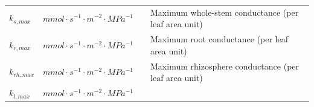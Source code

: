 \documentclass[]{book}
\begin{document}
\begin{longtable}[]{@{}llll@{}}
\begin{minipage}[t]{0.11\columnwidth}\raggedright
\(k_{s, max}\)\strut
\end{minipage} & \begin{minipage}[t]{0.10\columnwidth}\raggedright
\(mmol \cdot s^{-1} \cdot m^{-2} \cdot MPa^{-1}\)\strut
\end{minipage} & \begin{minipage}[t]{0.12\columnwidth}\raggedright
\strut
\end{minipage} & \begin{minipage}[t]{0.45\columnwidth}\raggedright
Maximum whole-stem conductance (per leaf area unit)\strut
\end{minipage}\tabularnewline
\begin{minipage}[t]{0.11\columnwidth}\raggedright
\(k_{r, max}\)\strut
\end{minipage} & \begin{minipage}[t]{0.10\columnwidth}\raggedright
\(mmol \cdot s^{-1} \cdot m^{-2} \cdot MPa^{-1}\)\strut
\end{minipage} & \begin{minipage}[t]{0.12\columnwidth}\raggedright
\strut
\end{minipage} & \begin{minipage}[t]{0.45\columnwidth}\raggedright
Maximum root conductance (per leaf area unit)\strut
\end{minipage}\tabularnewline
\begin{minipage}[t]{0.11\columnwidth}\raggedright
\(k_{rh, max}\)\strut
\end{minipage} & \begin{minipage}[t]{0.10\columnwidth}\raggedright
\(mmol \cdot s^{-1} \cdot m^{-2} \cdot MPa^{-1}\)\strut
\end{minipage} & \begin{minipage}[t]{0.12\columnwidth}\raggedright
\strut
\end{minipage} & \begin{minipage}[t]{0.45\columnwidth}\raggedright
Maximum rhizosphere conductance (per leaf area unit)\strut
\end{minipage}\tabularnewline
\begin{minipage}[t]{0.11\columnwidth}\raggedright
\(k_{l, max}\)\strut
\end{minipage} & \begin{minipage}[t]{0.10\columnwidth}\raggedright
\(mmol \cdot s^{-1} \cdot m^{-2} \cdot MPa^{-1}\)\strut
\end{minipage} & \begin{minipage}[t]{0.12\columnwidth}\raggedright

\end{minipage}
\end{longtable}
\end{document}
